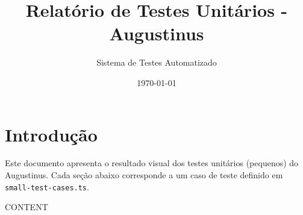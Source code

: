 \documentclass[12pt, a4paper]{article}
\title{Relatório de Testes Unitários - Augustinus}
\author{Sistema de Testes Automatizado}
\date{\today}
\begin{document}
\maketitle

\section{Introdução}
Este documento apresenta o resultado visual dos testes unitários (pequenos) do Augustinus. Cada seção abaixo corresponde a um caso de teste definido em \texttt{small-test-cases.ts}.

{{CONTENT}}
\end{document}
